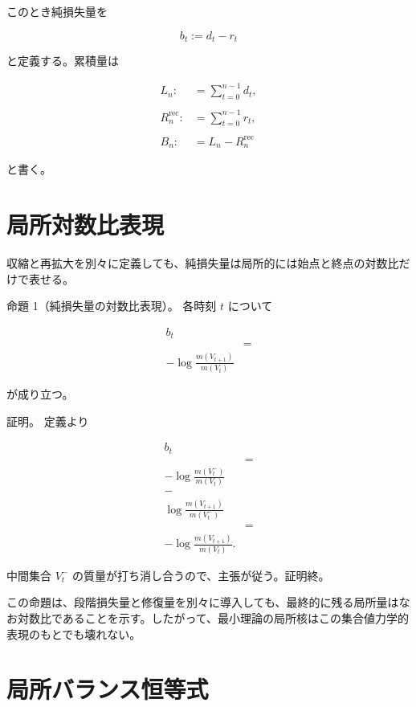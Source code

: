 \documentclass[12pt,a4paper]{article}
\begin{document}
このとき純損失量を

\[
b_{t} := d_{t} - r_{t}
\]

と定義する。累積量は

\[
\begin{aligned}
L_{n} :&= \sum_{t=0}^{n-1} d_{t}, \\
\qquad \\
R_{n}^{\mathrm{rec}} :&= \sum_{t=0}^{n-1} r_{t}, \\
\qquad \\
B_{n} :&= L_{n} - R_{n}^{\mathrm{rec}}
\end{aligned}
\]

と書く。

\section{局所対数比表現}\label{ux5c40ux6240ux5bfeux6570ux6bd4ux8868ux73fe}

収縮と再拡大を別々に定義しても、純損失量は局所的には始点と終点の対数比だけで表せる。

命題 1（純損失量の対数比表現）。 各時刻 \(t\) について

\[
\begin{aligned}
b_{t} \\
&= \\
- \log \frac{m(V_{t+1})}{m(V_{t})}
\end{aligned}
\]

が成り立つ。

証明。 定義より

\[
\begin{aligned}
b_{t} \\
&= \\
-\log \frac{m(V_{t}^-)}{m(V_{t})} \\
- \\
\log \frac{m(V_{t+1})}{m(V_{t}^-)} \\
&= \\
-\log \frac{m(V_{t+1})}{m(V_{t})}.
\end{aligned}
\]

中間集合 \(V_{t}^-\) の質量が打ち消し合うので、主張が従う。証明終。

この命題は、段階損失量と修復量を別々に導入しても、最終的に残る局所量はなお対数比であることを示す。したがって、最小理論の局所核はこの集合値力学的表現のもとでも壊れない。

\section{局所バランス恒等式}\label{ux5c40ux6240ux30d0ux30e9ux30f3ux30b9ux6052ux7b49ux5f0f}
\end{document}
